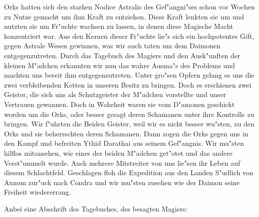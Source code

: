 \documentclass[a5paper,8pt]{book}
\begin{document}
Orks hatten sich den starken Nodice Astralis des Gef"angni"ses schon vor Wochen zu Nutze gemacht um ihm Kraft zu entziehen. Diese Kraft lenkten sie um und nutzten sie um Fr"uchte wachsen zu lassen, in denen diese Magische Macht konzentriert war. Aus den Kernen dieser Fr"uchte lie"s sich ein hochpotentes Gift, gegen Astrale Wesen gewinnen, was wir auch taten um dem Daimonen entgegenzutreten.
Durch das Tagebuch des Magiers und den Ausk"unften der kleinen M"adchen erkannten wir nun das wahre Ausma"s des Problems und machten uns bereit ihm entgegenzutreten. Unter gro"sen Opfern gelang es uns die zwei verbleibenden Ketten in unseren Besitz zu bringen. Doch es erschienen zwei Geister, die sich uns als Schutzgeister der M"adchen vorstellte und unser Vertrauen gewannen. Doch in Wahrheit waren sie vom D"amonen geschickt worden um die Orks, oder besser gesagt deren Schamanen unter ihre Kontrolle zu bringen. Wir f"uhrten die Beiden Geister, weil wir es nicht besser wu"sten, zu den Orks und sie beherrschten deren Schamanen. Dann zogen die Orks gegen uns in den Kampf und befreiten Ythid Darathai aus seinem Gef"angnis. Wir mu"sten hilflos mitansehen, wie eines der beiden M"adchen get"otet und das andere Verst"ummelt wurde. Auch mehrere Mitstreiter von uns lie"sen ihr Leben auf diesem Schlachtfeld.
Geschlagen floh die Expedition aus den Landen S"udlich von Axnom zur"uck nach Condra und wir mu"sten zusehen wie der Daimon seine Freiheit wiedererrang.

\newpage


Anbei eine Abschrift des Tagebuches, des besagten Magiers:

\vspace{5mm}
\end{document}
